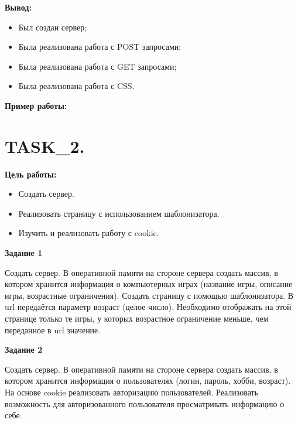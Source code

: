 \textbf{Вывод:}

\begin{itemize} 
	\item Был создан сервер;
	\item Была реализована работа с POST запросами;
	\item Была реализована работа с GET запросами;
	\item Была реализована работа с CSS.
\end{itemize}

\textbf{Пример работы:}



\chapter{TASK\_2.}

\textbf{Цель работы:}

\begin{itemize} 
	\item Создать сервер.
	\item Реализовать страницу с использованием шаблонизатора.
	\item Изучить и реализовать работу с cookie.
\end{itemize}

\textbf{Задание 1}

Создать сервер. В оперативной памяти на стороне сервера создать массив, в котором хранится информация о компьютерных играх (название игры, описание игры, возрастные ограничения). Создать страницу с помощью шаблонизатора. В url передаётся параметр возраст (целое число). Необходимо отображать на этой странице только те игры, у которых возрастное ограничение меньше, чем переданное в url значение.

\textbf{Задание 2}

Создать сервер. В оперативной памяти на стороне сервера создать массив, в котором хранится информация о пользователях (логин, пароль, хобби, возраст). На основе cookie реализовать авторизацию пользователей. Реализовать возможность для авторизованного пользователя просматривать информацию о себе.

